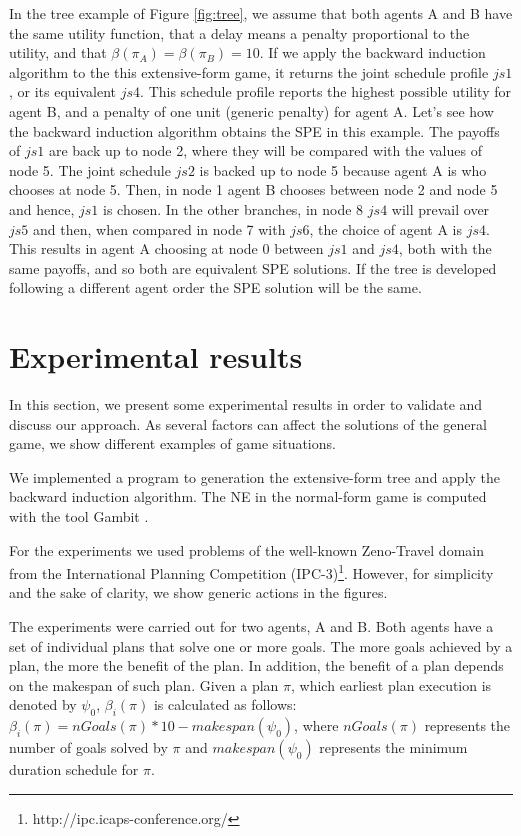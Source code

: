 \documentclass[letterpaper]{article}
\begin{document}
In the tree example of Figure \ref{fig:tree}, we assume that both agents A and B have the same utility function, that a delay means a penalty proportional to the utility, and that $\beta(\pi_A) = \beta(\pi_B) = 10$. If we apply the backward induction algorithm to the this extensive-form game, it returns the joint schedule profile $js1$, or its equivalent $js4$. This schedule profile reports the highest possible utility for agent B, and a penalty of one unit (generic penalty) for agent A. Let's see how the backward induction algorithm obtains the SPE in this example. The payoffs of $js1$ are back up to node 2, where they will be compared with the values of node 5.  The joint schedule $js2$ is backed up to node 5 because agent A is who chooses at node 5. Then, in node 1 agent B chooses between node 2 and node 5 and hence, $js1$ is chosen. In the other branches, in node 8 $js4$ will prevail over $js5$ and then, when compared in node 7 with $js6$, the choice of agent A is $js4$. This results in agent A choosing at node 0 between $js1$ and $js4$, both with the same payoffs, and so both are equivalent SPE solutions. If the tree is developed following a different agent order the SPE solution will be the same.


\section{Experimental results}
\label{experiments}


In this section, we present some experimental results in order to validate and discuss our approach. As several factors can affect the solutions of the general game, we show different examples of game situations.

We implemented a program to generation the extensive-form tree and apply the backward induction algorithm. The NE in the normal-form game is computed with the tool Gambit \cite{Gambit}.

For the experiments we used problems of the well-known Zeno-Travel domain from the International Planning Competition (IPC-3)\footnote{http://ipc.icaps-conference.org/}. However, for simplicity and the sake of clarity, we show generic actions in the figures.

The experiments were carried out for two agents, A and B. Both agents have a set of individual plans that solve one or more goals. The more goals achieved by a plan, the more the benefit of the plan. In addition, the benefit of a plan depends on the makespan of such plan. Given a plan $\pi$, which earliest plan execution is denoted by $\psi_0$, $\beta_i(\pi)$ is calculated as follows: $\beta_i(\pi)=nGoals(\pi)*10 - makespan(\psi_0)$, where $nGoals(\pi)$ represents the number of goals solved by $\pi$ and $makespan(\psi_0)$ represents the minimum duration schedule for $\pi$.
\end{document}

